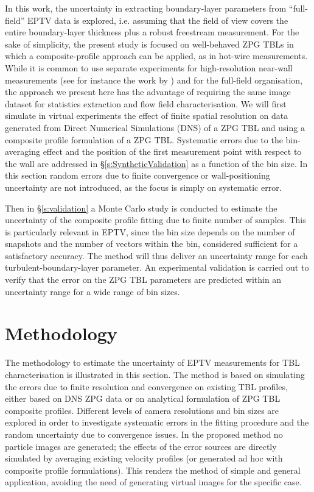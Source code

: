In this work, the uncertainty in extracting boundary-layer parameters from ``full-field'' EPTV data is explored, i.e. assuming that the field of view covers the entire {boundary-layer} thickness plus a robust freestream measurement. {For the sake of simplicity, the present study is focused on well-behaved ZPG TBLs in which a composite-profile approach can be applied, as in hot-wire measurements.} While it is common to use separate experiments for high-resolution near-wall measurements (see for instance the work by \citet{kahler2006wall}) and for the {full-field} organisation, the approach we present here has the advantage of requiring the same image dataset for statistics extraction and flow field characterisation.
We will first simulate in virtual experiments the effect of finite spatial resolution on data generated from Direct Numerical Simulations (DNS) of a {ZPG TBL} and using a composite profile {formulation of a ZPG TBL}. Systematic errors due to the bin-averaging effect and the position of the first measurement point with respect to the wall are addressed in \S \ref{s:SyntheticValidation} as a function of the bin size. {In this section random errors due to finite convergence or wall-positioning uncertainty are not introduced, as the focus is simply on systematic error.}

Then {in \S \ref{s:validation}} a {Monte Carlo} study is conducted to estimate the uncertainty of the composite profile fitting due to finite number of samples. This is particularly relevant in EPTV, since the bin size depends on the number of snapshots and the number of vectors within the bin, considered sufficient for a satisfactory accuracy. {The method will thus deliver an uncertainty range for each turbulent-boundary-layer parameter. An experimental validation is carried out to verify that the error on the ZPG TBL parameters are predicted within an uncertainty range for a wide range of bin sizes.} 

\section{Methodology}
The methodology to estimate the uncertainty of EPTV measurements for TBL characterisation is illustrated in this section. The method is based on simulating the errors due to finite resolution and convergence on existing TBL profiles, either based on DNS {ZPG} data or on analytical formulation of {ZPG TBL} composite profiles. Different levels of camera resolutions and bin sizes are explored in order to investigate systematic errors in the fitting procedure and the random uncertainty due to convergence issues. {In the proposed method no particle images are generated; the effects of the error sources are directly simulated by averaging existing velocity profiles (or generated ad hoc with composite profile formulations). This renders the method of simple and general application, avoiding the need of generating virtual images for the specific case.}

